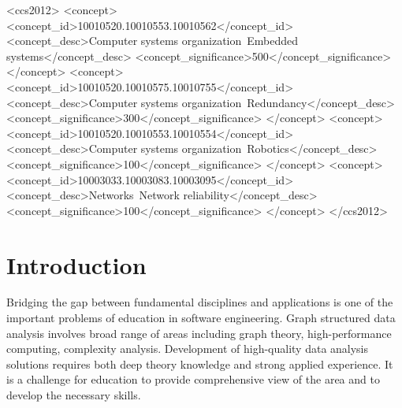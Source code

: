 \documentclass[sigconf]{acmart}
\begin{document}
\begin{CCSXML}
<ccs2012>
 <concept>
  <concept_id>10010520.10010553.10010562</concept_id>
  <concept_desc>Computer systems organization~Embedded systems</concept_desc>
  <concept_significance>500</concept_significance>
 </concept>
 <concept>
  <concept_id>10010520.10010575.10010755</concept_id>
  <concept_desc>Computer systems organization~Redundancy</concept_desc>
  <concept_significance>300</concept_significance>
 </concept>
 <concept>
  <concept_id>10010520.10010553.10010554</concept_id>
  <concept_desc>Computer systems organization~Robotics</concept_desc>
  <concept_significance>100</concept_significance>
 </concept>
 <concept>
  <concept_id>10003033.10003083.10003095</concept_id>
  <concept_desc>Networks~Network reliability</concept_desc>
  <concept_significance>100</concept_significance>
 </concept>
</ccs2012>
\end{CCSXML}




\maketitle

\section{Introduction}

Bridging the gap between fundamental disciplines and applications is one of the important problems of education in software engineering.
Graph structured data analysis involves broad range of areas including graph theory, high-performance computing, complexity analysis.
Development of high-quality data analysis solutions requires both deep theory knowledge and strong applied experience. 
It is a challenge for education to provide comprehensive view of the area and to develop the necessary skills.
\end{document}
